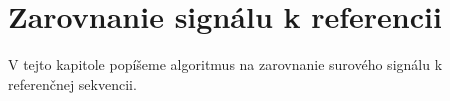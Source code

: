 \chapter{Zarovnanie signálu k referencii}

\label{kap:zarovnanie}

V tejto kapitole popíšeme algoritmus na zarovnanie surového signálu
k referenčnej sekvencii.
